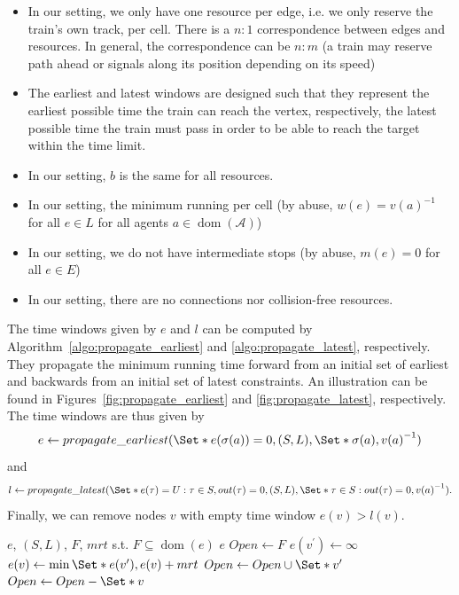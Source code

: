 \documentclass{article}
\DeclareMathOperator{\dom}{dom}
\begin{document}
\begin{itemize}
    \item In our setting, we only have one resource per edge, i.e. we only reserve the train's own track, per cell. There is a $n:1$ correspondence between edges and resources. In general, the correspondence can be $n:m$ (a train may reserve path ahead or signals along its position depending on its speed)
    \item The earliest and latest windows are designed such that they represent the earliest possible time the train can reach the vertex, respectively, the latest possible time the train must pass in order to be able to reach the target within the time limit.
    \item In our setting, $b$ is the same for all resources.
    \item In our setting, the minimum running per cell (by abuse, $w(e)= {v(a)}^{-1}$  for all $e \in L$ for all agents $a \in \dom(\mathcal{A})$)
    \item In our setting, we do not have intermediate stops (by abuse, $m(e)=0$ for all $e \in E$)
    \item In our setting, there are no connections nor collision-free resources.
\end{itemize}

The time windows given by $e$ and $l$ can be computed by Algorithm~\ref{algo:propagate_earliest} and \ref{algo:propagate_latest}, respectively. They propagate the minimum running time forward from an initial set of earliest and backwards from an initial set of latest constraints. An illustration can be found in Figures~\ref{fig:propagate_earliest} and \ref{fig:propagate_latest}, respectively.
The time windows are thus given by
$$e\leftarrow propagate\_earliest(\Set*{e(\sigma(a))=0}, (S,L), \Set*{\sigma(a)}, {v(a)}^{-1})$$ and $$l\leftarrow propagate\_latest(\Set*{e(\tau)=U: \tau \in S, out(\tau)=0}, (S,L), \Set*{\tau \in S: out(\tau)=0},{v(a)}^{-1}).$$
Finally, we can remove nodes $v$ with empty time window $e(v)>l(v)$.





\begin{algorithm}
	\caption{$propagate\_earliest$} \label{algo:propagate_earliest}
	\begin{algorithmic}[1]
	    \Require $e$, $(S,L)$, $F$, $mrt$ s.t. $F\subseteq \dom(e)$
	    \Ensure $e$
	    \State $Open \leftarrow F$
    	        \If{$v^\prime \not\in \dom(e)$}
    	            \State $e(v^\prime) \leftarrow \infty$
    	        \EndIf
    			\State $e(v) \leftarrow \min \Set*{e(v^\prime), e(v)+mrt}$
    			\State $Open \leftarrow Open \cup \Set*{v^\prime}$
    		\EndFor
			\State $Open \leftarrow Open - \Set*{v}$
		\EndFor
	\end{algorithmic}
\end{algorithm}
\end{document}
